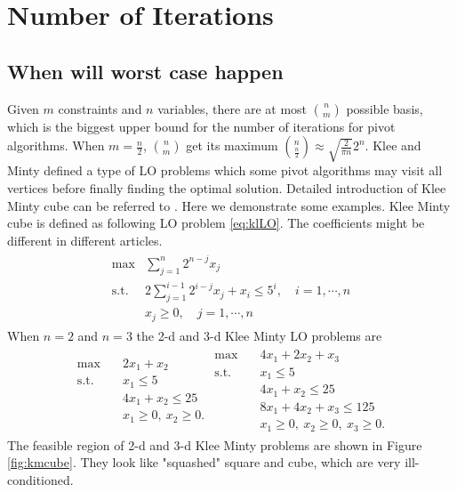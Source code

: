 \documentclass[11pt]{article}
\begin{document}
\section{Number of Iterations}
\subsection{When will worst case happen} \label{secworst}
Given $m$ constraints and $n$ variables, there are at most $\binom{n}{m}$ possible basis, which is the biggest upper bound for the number of iterations for pivot algorithms. When $m=\frac{n}{2}$, $\binom{n}{m}$ get its maximum $\binom{n}{\frac{n}{2}}\approx \sqrt{\frac{2}{\pi n}}2^n$. Klee and Minty defined a type of LO problems which some pivot algorithms may visit all vertices before finally finding the optimal solution. Detailed introduction of Klee Minty cube can be referred to \cite{vanderbei2020linear}. Here we demonstrate some examples. Klee Minty cube is defined as following LO problem \ref{eq:klLO}. The coefficients might be different in different articles. 
\begin{align}
\begin{split}
\max &\sum_{j=1}^n 2^{n-j}x_j \\
\text{s.t. } & 2\sum_{j=1}^{i-1}2^{i-j}x_j + x_i \le 5^i, \quad i=1,\cdots,n\\
			&x_j \ge 0,  \quad j=1,\cdots,n
\end{split}\label{eq:klLO}
\end{align} 
When $n=2$ and $n=3$ the 2-d and 3-d Klee Minty LO problems are 
\begin{align*}
\begin{split}
\max \quad & 2x_1 + x_2 \\
\text{s.t. }\quad  & x_1 \le 5\\
& 4x_1 + x_2 \le 25\\
& x_1 \ge 0,\ x_2 \ge 0.
\end{split}
\begin{split}
\max \quad & 4x_1 + 2x_2 + x_3 \\
\text{s.t. }\quad  & x_1 \le 5\\
& 4x_1 + x_2 \le 25\\
& 8x_1 + 4x_2 + x_3 \le 125\\
& x_1 \ge 0,\ x_2 \ge 0, \ x_3 \ge 0.
\end{split}
\end{align*}
The feasible region of 2-d and 3-d Klee Minty problems are shown in Figure \ref{fig:kmcube}. They look like "squashed" square and cube, which are very ill-conditioned.
\end{document}

